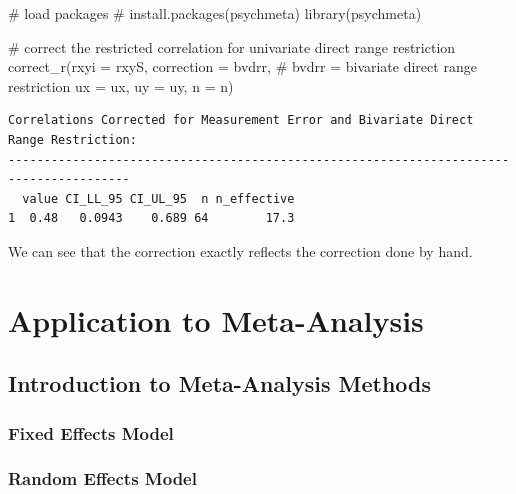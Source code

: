 \documentclass[
  letterpaper,
  DIV=11,
  numbers=noendperiod]{scrreprt}
\newenvironment{Shaded}{\begin{snugshade}}{\end{snugshade}}
\newcommand{\AttributeTok}[1]{\textcolor[rgb]{0.40,0.45,0.13}{#1}}
\newcommand{\CommentTok}[1]{\textcolor[rgb]{0.37,0.37,0.37}{#1}}
\newcommand{\FunctionTok}[1]{\textcolor[rgb]{0.28,0.35,0.67}{#1}}
\newcommand{\NormalTok}[1]{\textcolor[rgb]{0.00,0.23,0.31}{#1}}
\newcommand{\StringTok}[1]{\textcolor[rgb]{0.13,0.47,0.30}{#1}}
\begin{document}
\begin{Shaded}
\begin{Highlighting}[]
\CommentTok{\# load packages}
\CommentTok{\# install.packages(\textquotesingle{}psychmeta\textquotesingle{})}
\FunctionTok{library}\NormalTok{(psychmeta)}

\CommentTok{\# correct the restricted correlation for univariate direct range restriction}
\FunctionTok{correct\_r}\NormalTok{(}\AttributeTok{rxyi =}\NormalTok{ rxyS,}
          \AttributeTok{correction =} \StringTok{\textquotesingle{}bvdrr\textquotesingle{}}\NormalTok{,  }\CommentTok{\# bvdrr = bivariate direct range restriction}
          \AttributeTok{ux =}\NormalTok{ ux,}
          \AttributeTok{uy =}\NormalTok{ uy,}
          \AttributeTok{n =}\NormalTok{ n)}
\end{Highlighting}
\end{Shaded}

\begin{verbatim}
Correlations Corrected for Measurement Error and Bivariate Direct Range Restriction:
---------------------------------------------------------------------------------------
  value CI_LL_95 CI_UL_95  n n_effective
1  0.48   0.0943    0.689 64        17.3
\end{verbatim}

We can see that the correction exactly reflects the correction done by
hand.

\part{Application to Meta-Analysis}

\hypertarget{introduction-to-meta-analysis-methods}{%
\chapter{Introduction to Meta-Analysis
Methods}\label{introduction-to-meta-analysis-methods}}

\hypertarget{fixed-effects-model}{%
\section{Fixed Effects Model}\label{fixed-effects-model}}

\hypertarget{random-effects-model}{%
\section{Random Effects Model}\label{random-effects-model}}
\end{document}

